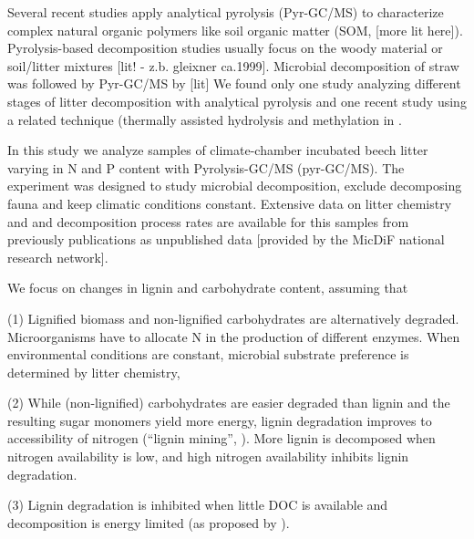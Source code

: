 
Several recent studies apply analytical pyrolysis (Pyr-GC/MS) to characterize complex natural organic polymers like soil organic matter (SOM, \cite{Vancampenhout2010}[more lit here]). 
Pyrolysis-based decomposition studies usually focus on the woody material \citep{Vinciguerra2007} or  soil/litter mixtures [lit! - z.b. gleixner ca.1999]. Microbial decomposition of straw was followed by Pyr-GC/MS by [lit] We found only one study analyzing different stages of litter decomposition with analytical pyrolysis \citep{Franchini2002} and one recent study using a related technique (thermally assisted hydrolysis and methylation in \citep{Snajdr2011}. 

\cite{Kuder1998}

In this study we analyze samples of climate-chamber incubated beech litter varying in N and P content with Pyrolysis-GC/MS (pyr-GC/MS). The experiment was designed to study microbial decomposition, exclude decomposing fauna and keep climatic conditions constant. Extensive data on litter chemistry and and decomposition process rates are available for this samples from previously publications \citep{Mooshammer2011, Wanek2011, Leitner2011} as unpublished data [provided by the MicDiF national research network]. 

We focus on changes in lignin and carbohydrate content, assuming that

(1) Lignified biomass and non-lignified carbohydrates are alternatively degraded. Microorganisms have to allocate N in the production of different enzymes. When environmental conditions are constant, microbial substrate preference is determined by litter chemistry,

(2) While (non-lignified) carbohydrates are easier degraded than lignin and the resulting sugar monomers yield more energy, lignin degradation improves to accessibility of nitrogen (``lignin mining'', \cite{Craine2007}). 
 More lignin is decomposed when nitrogen availability is low, and high nitrogen availability inhibits lignin degradation.

(3) Lignin degradation is inhibited when little DOC is available and decomposition is energy limited (as proposed by \cite{Klotzbucher2011}). 

